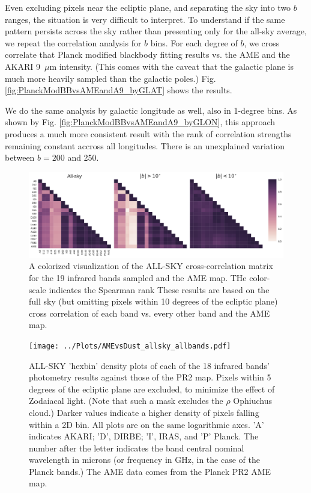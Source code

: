 \documentclass[preprint2,longabstract]{aastex}
\begin{document}
    Even excluding pixels near the ecliptic plane, and separating the sky into two $b$ ranges, the situation is very difficult to interpret. To understand if the same pattern persists across the sky rather than presenting only for the all-sky average, we repeat the correlation analysis for $b$ bins. For each degree of $b$, we cross correlate that Planck modified blackbody fitting results vs. the AME and the AKARI 9~$\mu$m intensity. (This comes with the caveat that the galactic plane is much more heavily sampled than the galactic poles.) Fig. \ref{fig:PlanckModBBvsAMEandA9_byGLAT} shows the results.

    We do the same analysis by galactic longitude as well, also in 1-degree bins. As shown by Fig.  \ref{fig:PlanckModBBvsAMEandA9_byGLON}, this approach produces a much more consistent result with the rank of correlation strengths remaining constant accross all longitudes. There is an unexplained variation between $b = 200$ and 250.


      \begin{figure}
        \label{fig:AME_IR_crosscorr_allbandsg}
        \includegraphics[width=185mm]{../Plots/all_bands_corr_matrix_wAME_spearman.pdf}
        \centering
        \caption{A colorized visualization of the ALL-SKY cross-correlation matrix for the 19 infrared bands sampled and the AME map. THe color-scale indicates the Spearman rank These results are based on the full sky (but omitting pixels within 10 degrees of the ecliptic plane) cross correlation of each band vs. every other band and the AME map. }
      \end{figure}



      \begin{figure}
        \label{fig:AMEvsDust_allsky_allbands}
        \texttt{[image: ../Plots/AMEvsDust\_allsky\_allbands.pdf]}
        \centering
        \caption{ALL-SKY 'hexbin' density plots of each of the 18 infrared bands' photometry results against those of the PR2 map. Pixels within 5 degrees of the ecliptic plane are excluded, to minimize the effect of Zodaiacal light. (Note that such a mask excludes the $\rho$ Ophiuchus cloud.) Darker values indicate a higher density of pixels falling within a 2D bin. All plots are on the same logarithmic axes. 'A' indicates AKARI; 'D', DIRBE; 'I', IRAS, and 'P' Planck. The number after the letter indicates the band central nominal wavelength in microns (or frequency in GHz, in the case of the Planck bands.) The AME data comes from the Planck PR2 AME map.}
      \end{figure}
\end{document}
